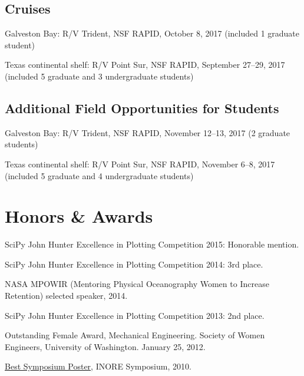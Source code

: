 \documentclass[10pt,letterpaper]{article}
\renewenvironment{itemize}{
  \begin{list}{}{
    \setlength{\leftmargin}{1.5em}
    \setlength{\itemsep}{0.25em}
    \setlength{\parskip}{0pt}
    \setlength{\parsep}{0.25em}
  }
}{
  \end{list}
}
\begin{document}
\subsection*{Cruises}
\begin{itemize}
    \item Galveston Bay: R/V Trident, NSF RAPID, October 8, 2017 (included 1 graduate student)
    \item Texas continental shelf: R/V Point Sur, NSF RAPID, September 27--29, 2017 (included 5 graduate and 3 undergraduate students)
\end{itemize}

\subsection*{Additional Field Opportunities for Students}
\begin{itemize}
    \item Galveston Bay: R/V Trident, NSF RAPID, November 12--13, 2017 (2 graduate students)
    \item Texas continental shelf: R/V Point Sur, NSF RAPID, November 6--8, 2017 (included 5 graduate and 4 undergraduate students)
\end{itemize}


\section*{Honors \& Awards}

\begin{itemize}

\item SciPy John Hunter Excellence in Plotting Competition 2015: Honorable mention.

\item SciPy John Hunter Excellence in Plotting Competition 2014: 3rd place.

\item NASA MPOWIR (Mentoring Physical Oceanography Women to Increase Retention) selected speaker, 2014.

\item SciPy John Hunter Excellence in Plotting Competition 2013: 2nd place.

\item Outstanding Female Award, Mechanical Engineering. Society of Women Engineers, University of Washington. January 25, 2012.

\item \href{http://www.inore.org}{Best Symposium Poster}, INORE Symposium, 2010.


%

\end{itemize}
\end{document}
